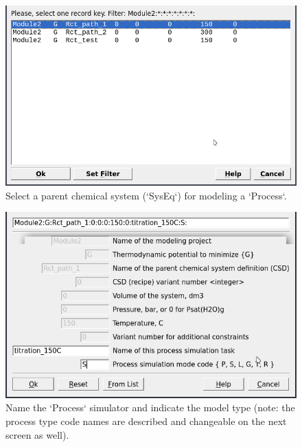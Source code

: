 \documentclass[
]{book}
\begin{document}
\begin{figure}
\includegraphics[width=0.7\linewidth]{figures/module2/fig-5} \caption{Select a parent chemical system (`SysEq`) for modeling a `Process`.}\label{fig:fig-5b}
\end{figure}
\begin{figure}
\includegraphics[width=0.7\linewidth]{figures/module2/fig-6} \caption{Name the `Process` simulator and indicate the model type (note: the process type code names are described and changeable on the next screen as well).}\label{fig:fig-6b}
\end{figure}
\end{document}
